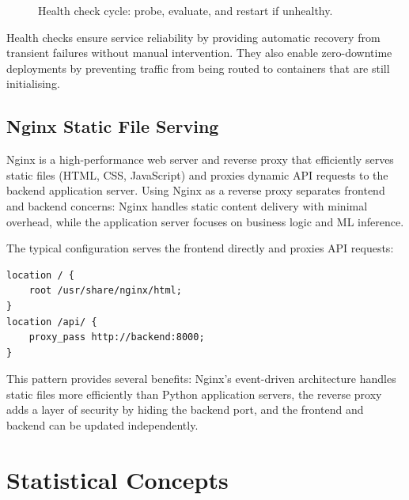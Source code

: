 \documentclass[10pt,a4paper]{article}
\begin{document}
\begin{figure}[H]
    \centering
    \caption{Health check cycle: probe, evaluate, and restart if unhealthy.}
    \label{fig:health-check-cycle}
\end{figure}

Health checks ensure service reliability by providing automatic recovery from transient failures without manual intervention. They also enable zero-downtime deployments by preventing traffic from being routed to containers that are still initialising.

\subsection{Nginx Static File Serving}
\label{sec:nginx}

Nginx is a high-performance web server and reverse proxy that efficiently serves static files (HTML, CSS, JavaScript) and proxies dynamic API requests to the backend application server. Using Nginx as a reverse proxy separates frontend and backend concerns: Nginx handles static content delivery with minimal overhead, while the application server focuses on business logic and ML inference.

The typical configuration serves the frontend directly and proxies API requests:

\begin{lstlisting}[basicstyle=\ttfamily\small]
location / {
    root /usr/share/nginx/html;
}
location /api/ {
    proxy_pass http://backend:8000;
}
\end{lstlisting}

This pattern provides several benefits: Nginx's event-driven architecture handles static files more efficiently than Python application servers, the reverse proxy adds a layer of security by hiding the backend port, and the frontend and backend can be updated independently.

\section{Statistical Concepts}
\label{sec:statistics}
\end{document}
